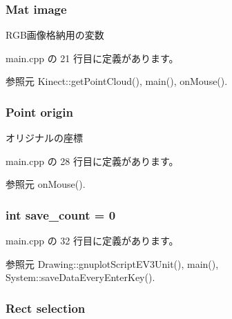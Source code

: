\subsubsection[{image}]{\setlength{\rightskip}{0pt plus 5cm}Mat image}\label{main_8cpp_aabb27b8973575043030df51be47cd24a}


R\-G\-B画像格納用の変数 



 main.\-cpp の 21 行目に定義があります。



参照元 Kinect\-::get\-Point\-Cloud(), main(), on\-Mouse().

\subsubsection[{origin}]{\setlength{\rightskip}{0pt plus 5cm}Point origin}\label{main_8cpp_a903d0d8820c696aaa1170c50deb3633f}


オリジナルの座標 



 main.\-cpp の 28 行目に定義があります。



参照元 on\-Mouse().

\subsubsection[{save\-\_\-count}]{\setlength{\rightskip}{0pt plus 5cm}int save\-\_\-count = 0}\label{main_8cpp_aacae5d304dcef5f6bbf0fe5030e50626}


 main.\-cpp の 32 行目に定義があります。



参照元 Drawing\-::gnuplot\-Script\-E\-V3\-Unit(), main(), System\-::save\-Data\-Every\-Enter\-Key().

\subsubsection[{selection}]{\setlength{\rightskip}{0pt plus 5cm}Rect selection}\label{main_8cpp_a15633c47538e3790df1e008a7f6dbfea}


